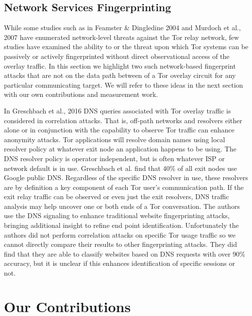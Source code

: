 \documentclass[sigconf]{acmart}
\begin{document}
\subsection{Network Services Fingerprinting}

While some studies such as in Feamster \& Dingledine 2004
\cite{feamster_location_2004} and Murdoch et al., 2007
\cite{murdoch_sampled_2007} have enumerated network-level threats
against the Tor relay network, few studies have examined the ability to
or the threat upon which Tor systems can be passively or actively
fingerprinted without direct observational access of the overlay
traffic.  In this section we highlight two such network-based
fingerprint attacks that are not on the data path between of a Tor
overlay circuit for any particular communicating target.  We will refer
to these ideas in the next section with our own contributions and
measurement work.

In Greschbach et al., 2016 \cite{greschbach_effect_2016} DNS queries
associated with Tor overlay traffic is considered in correlation
attacks.  That is, off-path networks and resolvers either alone or in
conjunction with the capability to observe Tor traffic can enhance
anonymity attacks.  Tor applications will resolve domain names using
local resolver policy at whatever exit node an application happens to be
using.  The DNS resolver policy is operator independent, but is often
whatever ISP or network default is in use.  Greschbach et al. find that
40\% of all exit nodes use Google public DNS.  Regardless of the
specific DNS resolver in use, these resolvers are by definition a key
component of each Tor user's communication path.  If the exit relay
traffic can be observed or even just the exit resolvers, DNS traffic
analysis may help uncover one or both ends of a Tor conversation.  The
authors use the DNS signaling to enhance traditional website
fingerprinting attacks, bringing additional insight to refine end point
identification.  Unfortunately the authors did not perform correlation
attacks on specific Tor usage traffic so we cannot directly compare
their results to other fingerprinting attacks.  They did find that they
are able to classify websites based on DNS requests with over 90\%
accuracy, but it is unclear if this enhances identification of specific
sessions or not.

\section{Our Contributions}\label{sec:our_contributions}
\end{document}
